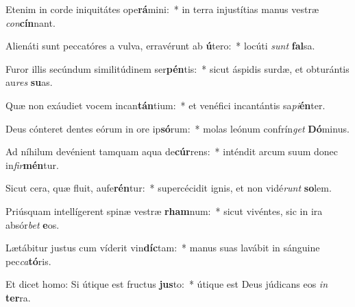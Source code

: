 \item Etenim in corde iniquitátes ope\textbf{rá}mini:~* in terra injustítias manus vestræ \textit{con}\textbf{cín}nant.
\item Alienáti sunt peccatóres a vulva, erravérunt ab \textbf{ú}tero:~* locúti \textit{sunt} \textbf{fal}sa.
\item Furor illis secúndum similitúdinem ser\textbf{pén}tis:~* sicut áspidis surdæ, et obturántis au\textit{res} \textbf{su}as.
\item Quæ non exáudiet vocem incan\textbf{tán}tium:~* et venéfici incantántis sa\textit{pi}\textbf{én}ter.
\item Deus cónteret dentes eórum in ore ip\textbf{só}rum:~* molas leónum confrín\textit{get} \textbf{Dó}minus.
\item Ad níhilum devénient tamquam aqua de\textbf{cúr}rens:~* inténdit arcum suum donec in\textit{fir}\textbf{mén}tur.
\item Sicut cera, quæ fluit, aufe\textbf{rén}tur:~* supercécidit ignis, et non vidé\textit{runt} \textbf{so}lem.
\item Priúsquam intellígerent spinæ vestræ \textbf{rham}num:~* sicut vivéntes, sic in ira absór\textit{bet} \textbf{e}os.
\item Lætábitur justus cum víderit vin\textbf{díc}tam:~* manus suas lavábit in sánguine pec\textit{ca}\textbf{tó}ris.
\item Et dicet homo: Si útique est fructus \textbf{jus}to:~* útique est Deus júdicans eos \textit{in} \textbf{ter}ra.
